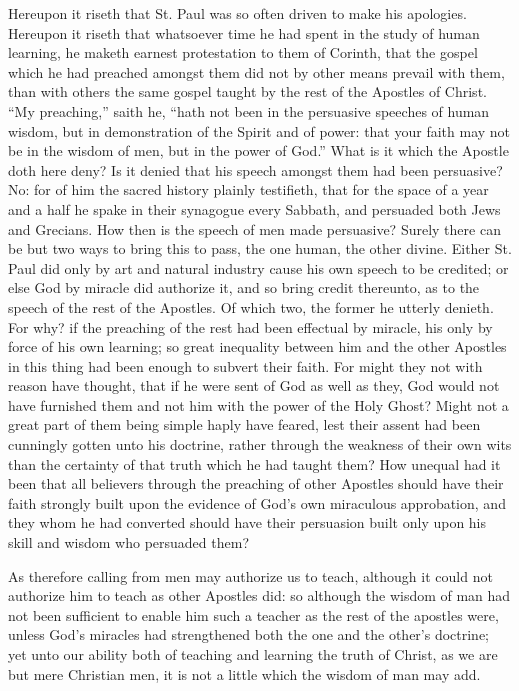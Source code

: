 Hereupon it riseth that St. Paul was so often driven to make his apologies. Hereupon it riseth that whatsoever time he had spent in the study of human learning, he maketh earnest protestation to them of Corinth, that the gospel which he had preached amongst them did not by other means prevail with them, than with others the same gospel taught by the rest of the Apostles of Christ. “My preaching,” saith he, “hath not been in the persuasive speeches of human wisdom, but in demonstration of the Spirit and of power: that your faith may not be in the wisdom of men, but in the power of God.” What is it which the Apostle doth here deny? Is it denied that his speech amongst them had been persuasive? No: for of him the sacred history plainly testifieth, that for the space of a year and a half he spake in their synagogue every Sabbath, and persuaded both Jews and Grecians. How then is the speech of men made persuasive? Surely there can be but two ways to bring this to pass, the one human, the other divine. Either St. Paul did only by art and natural industry cause his own speech to be credited; or else God by  miracle did authorize it, and so bring credit thereunto, as to the speech of the rest of the Apostles. Of which two, the former he utterly denieth. For why? if the preaching of the rest had been effectual by miracle, his only by force of his own learning; so great inequality between him and the other Apostles in this thing had been enough to subvert their faith. For might they not with reason have thought, that if he were sent of God as well as they, God would not have furnished them and not him with the power of the Holy Ghost? Might not a great part of them being simple haply have feared, lest their assent had been cunningly gotten unto his doctrine, rather through the weakness of their own wits than the certainty of that truth which he had taught them? How unequal had it been that all believers through the preaching of other Apostles should have their faith strongly built upon the evidence of God’s own miraculous approbation, and they whom he had converted should have their persuasion built only upon his skill and wisdom who persuaded them?

As therefore calling from men may authorize us to teach, although it could not authorize him to teach as other Apostles did: so although the wisdom of man had not been sufficient to enable him such a teacher as the rest of the apostles were, unless God’s miracles had strengthened both the one and the other’s doctrine; yet unto our ability both of teaching and learning the truth of Christ, as we are but mere Christian men, it is not a little which the wisdom of man may add.


